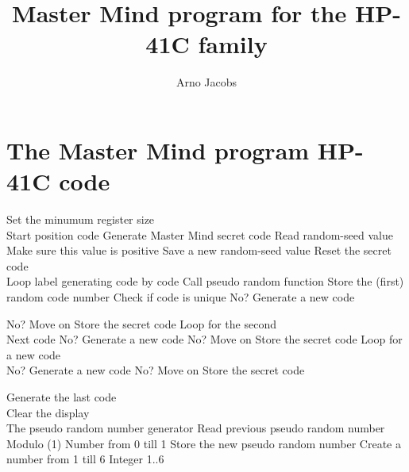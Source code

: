 \documentclass[a4paper, landscape]{article}
\author{Arno Jacobs}
\title{Master Mind program for the HP-41C family}
\begin{document}
\maketitle
\tableofcontents

\clearpage
\section{The Master Mind program HP-41C code}

\tStarttabular
{}
      {Set the minumum register size}
\\
     {Start position code Generate Master Mind secret code}  
       {Read random-seed value}  
       {}  
    {Make sure this value is positive}   
       {Save a new random-seed value} 
        {} 
       {Reset the secret code} 
       {} 
       {} 
\\
       {Loop label generating code by code} 
       {Call pseudo random function} 
       {Store the (first) random code number} 
       {Check if code is unique} 
\tXeqYfo           {} 
       {No? Generate a new code } 

\tNewPage

       {No? Move on} 
       {} 
       {Store the secret code} 
       {Loop for the second} 
\\
       {Next code} 
       {} 
       {} 
       {No? Generate a new code} 
       {No? Move on} 
       {} 
       {Store the secret code} 
       {Loop for a new code} 
\\
       {}
       {} 
       {} 
       {No? Generate a new code} 
       {No? Move on} 
       {} 
       {Store the secret code} 

\tNewPage

       {Generate the last code} 
\\
       {} 
        {Clear the display} 
\\
       {The pseudo random number generator} 
       {Read previous pseudo random number} 
        {} 
\tOPmultiplyfo     {} 
        {} 
    {Modulo (1)  Number from 0 till 1} 
       {Store the new pseudo random number} 
        {Create a number from 1 till 6} 
\tOPmultiplyfo     {} 
        {} 
\tOPplusfo         {} 
    {Integer 1..6} 
\end{document}
